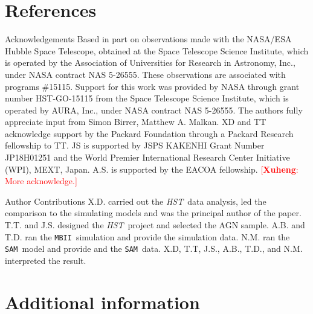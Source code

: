 \documentclass{natureprintstyle}
\newcommand{\hst}{{\it HST}}
\newcommand{\lenstronomy}{{\sc Lenstronomy}}
\newcommand{\sam}{\texttt{SAM}}
\newcommand{\mbii}{\texttt{MBII}}
\newcommand{\ding}[1]{\textcolor{red}{[{\bf Xuheng}: #1]}}
\begin{document}

\section*{References}
 


\begin{addendum}
 \item[Acknowledgements] 
Based in part on observations made with the NASA/ESA Hubble Space Telescope, obtained at the Space Telescope Science Institute, which is operated by the Association of Universities for Research in Astronomy, Inc., under NASA contract NAS 5-26555. These observations are associated with programs \#15115. Support for this work was provided by NASA through grant number HST-GO-15115 from the Space Telescope Science Institute, which is operated by AURA, Inc., under NASA contract NAS 5-26555. The authors fully appreciate input from Simon Birrer, Matthew A. Malkan. XD and TT acknowledge support by the Packard Foundation through a Packard Research fellowship to TT. JS is supported by JSPS KAKENHI Grant Number JP18H01251 and the World Premier International Research Center Initiative (WPI), MEXT, Japan. A.S. is supported by the EACOA fellowship.
\ding{More acknowledge.}

%
\item[Author Contributions] X.D. carried out the \hst\ data analysis, led the comparison to the simulating models and was the principal author of the paper. T.T. and J.S. designed the \hst\ project and selected the AGN sample. A.B. and T.D. ran the \mbii\ simulation and provide the simulation data. N.M. ran the \sam\ model and provide and the \sam\ data. X.D, T.T, J.S., A.B., T.D., and N.M. interpreted the result.

\end{addendum}

\section*{Additional information}
\end{document}
